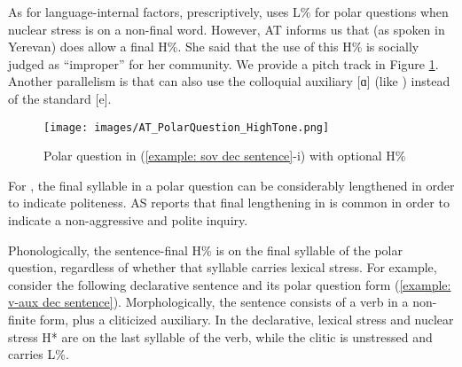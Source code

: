  
		As for language-internal factors, prescriptively, {\seaSEA} uses L\% for polar questions when nuclear stress is on a non-final word. However, AT informs us that {\seaCEA} (as spoken in Yerevan) does allow a final H\%. She said that the use of this H\% is socially judged   as ``improper'' for her {\seaEA} community. We provide a pitch track in Figure \ref{fig:eastern polar H}. Another parallelism is that {\seaCEA} can also use the colloquial auxiliary [ɑ] (like {\iaAbbre}) instead of the standard [e]. 
		
 
		
		\begin{figure}
			\caption{Polar question in {\seaSE} (\ref{example: sov dec sentence}-i) with optional H\% }
			\label{fig:eastern polar H}
			\texttt{[image: images/AT\_PolarQuestion\_HighTone.png]}
		\end{figure}
		
		For {\iaIA}, the final syllable in a polar question can be considerably lengthened in order to indicate politeness. AS reports that final lengthening in {\iaIA} is common in order to indicate a non-aggressive and polite inquiry.
		
		Phonologically, the sentence-final H\% is on the final syllable of the polar question, regardless of whether that syllable carries lexical stress. 	For example, consider the following declarative sentence and its polar question form (\ref{example: v-aux dec sentence}). Morphologically, the sentence consists of a verb in a non-finite form, plus a   cliticized auxiliary. In the declarative, lexical stress and nuclear stress H* are on the last syllable of the verb, while the  clitic is unstressed and carries L\%. 
		
